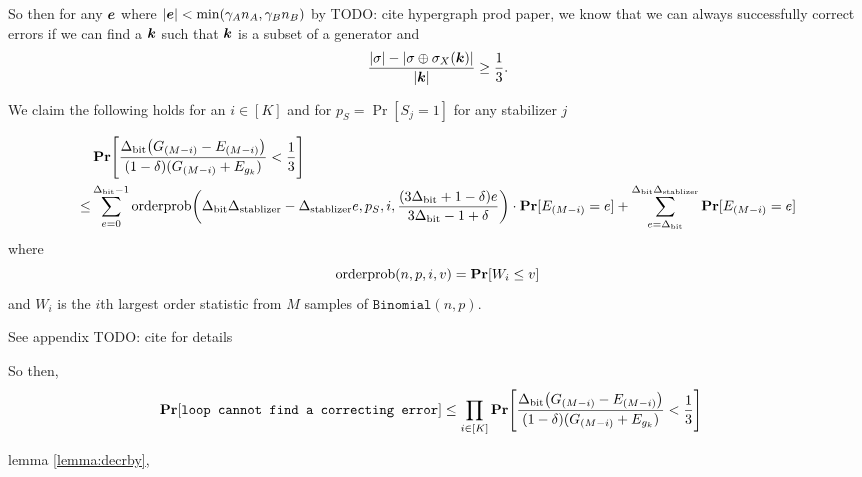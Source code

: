 So then for any $\boldsymbol{\boldsymbol{e}}$ where $|\boldsymbol{\boldsymbol{e}}| < \min(\gamma_An_A, \gamma_Bn_B)$ by TODO: cite hypergraph prod paper, we know that we can always successfully
correct errors if we can find a $\boldsymbol{\boldsymbol{k}}$ such that $\boldsymbol{\boldsymbol{k}}$ is a subset of a generator and
$$
	\frac{|\sigma| - |\sigma \oplus \sigma_X(\boldsymbol{\boldsymbol{k}})|}{|\boldsymbol{\boldsymbol{k}}|}	\geq \frac{1}{3}.
$$

\newcommand{\OptVarRV}{Q}
\newcommand{\OptVarEqChangeable}[1]{
\frac
			{\DegBit \mleft(#1_{\OrderStatDenomi} - \lyingGenerator_{\OrderStatDenomi}\mright)}
			{(1 - \delta)(#1_{\OrderStatDenomi} + \lyingGenerator_{g_k})}
}
\newcommand{\OptVarEq}{\OptVarEqChangeable{\genscoreRVCorrected}}

\begin{lemma}{We claim the following holds for an $i \in [K]$ and for $p_S = \Pr[S_j = 1]$ for any stabilizer $j$}
	
\begin{align*}
	&\Pr\mleft[\OptVarEq < \frac{1}{3}\mright] \\
	\leq &\sum_{e = 0}^{\DegBit - 1} 
			\OrderP\mleft(\DegBit\DegStable - \DegStable e, p_S, i, \frac{(3\DegBit + 1 - \delta) e}{3\DegBit -1 + \delta}\mright) \cdot \Pr[E_{\OrderStatDenomi} = e] 
			+ \sum_{e = \DegBit}^{\DegBit\DegStable}\Pr[E_{\OrderStatDenomi} = e]
\end{align*}
where
$$
	\OrderP(n, p, i, v) = \Pr\mleft[W_i \leq v \mright]
$$
and $W_i$ is the $i$th largest order statistic from $M$ samples of $\texttt{Binomial}(n, p)$.

See appendix TODO: cite for details
\end{lemma}

So then, \begin{align*}
	\Pr\mleft[\texttt{loop cannot find a correcting error}\mright] &\leq
		\prod_{i \in [K]} \Pr\mleft[\OptVarEq < \frac{1}{3} \mright]
\end{align*}



 lemma \ref{lemma:decrby}, 


